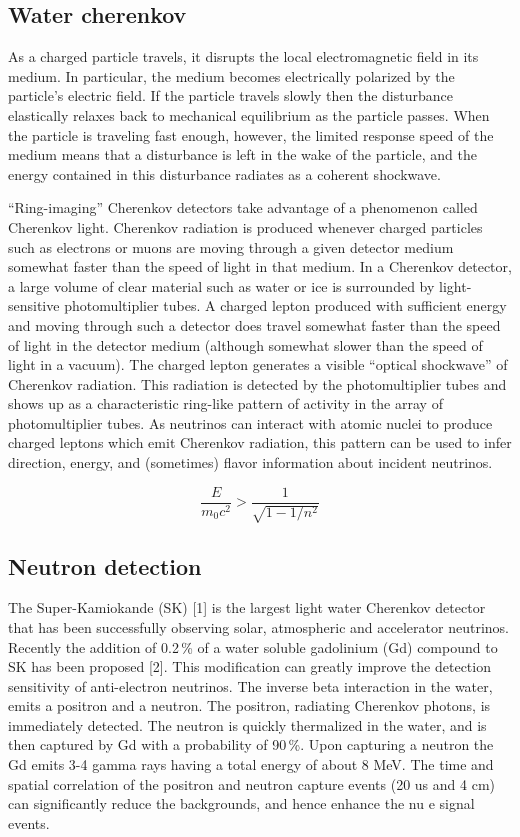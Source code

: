 \subsection{Water cherenkov}
\label{sec:1.3.1}
As a charged particle travels, it disrupts the local electromagnetic field in its medium.
In particular, the medium becomes electrically polarized by the particle's electric field.
If the particle travels slowly then the disturbance elastically relaxes back to %
mechanical equilibrium as the particle passes.
When the particle is traveling fast enough, however, the limited response speed of %
the medium means that a disturbance is left in the wake of the particle, %
and the energy contained in this disturbance radiates as a coherent shockwave.

``Ring-imaging'' Cherenkov detectors take advantage of a phenomenon called Cherenkov light.
Cherenkov radiation is produced whenever charged particles such as electrons or muons %
are moving through a given detector medium somewhat faster than the speed of light in that medium.
In a Cherenkov detector, a large volume of clear material such as water or ice %
is surrounded by light-sensitive photomultiplier tubes.
A charged lepton produced with sufficient energy and moving through %
such a detector does travel somewhat faster than the speed of light in the detector medium %
(although somewhat slower than the speed of light in a vacuum).
The charged lepton generates a visible ``optical shockwave'' of Cherenkov radiation.
This radiation is detected by the photomultiplier tubes and shows up as a characteristic %
ring-like pattern of activity in the array of photomultiplier tubes.
As neutrinos can interact with atomic nuclei to produce charged leptons which emit %
Cherenkov radiation, this pattern can be used to infer direction, energy, %
and (sometimes) flavor information about incident neutrinos.

\begin{equation}
  \label{eq:ch_Eth}
  \frac{E}{m_0 c^2} > \frac{1}{\sqrt{1-1/n^2}}
\end{equation}

\subsection{Neutron detection}
\label{sec:1.3.2}
The Super-Kamiokande (SK) [1] is the largest light water Cherenkov detector %
that has been successfully observing solar, atmospheric and accelerator neutrinos.
Recently the addition of 0.2\,\% of a water soluble gadolinium (Gd) compound to SK %
has been proposed [2].
This modification can greatly improve the detection sensitivity of anti-electron neutrinos.
The inverse beta interaction in the water, emits a positron and a neutron.
The positron, radiating Cherenkov photons, is immediately detected.
The neutron is quickly thermalized in the water, and is then captured by Gd with a %
probability of 90\,\%.
Upon capturing a neutron the Gd emits 3-4 gamma rays having a total energy of %
about 8 MeV.
The time and spatial correlation of the positron and neutron capture events (20 us and 4 cm) %
can significantly reduce the backgrounds, and hence enhance the nu e signal events.


